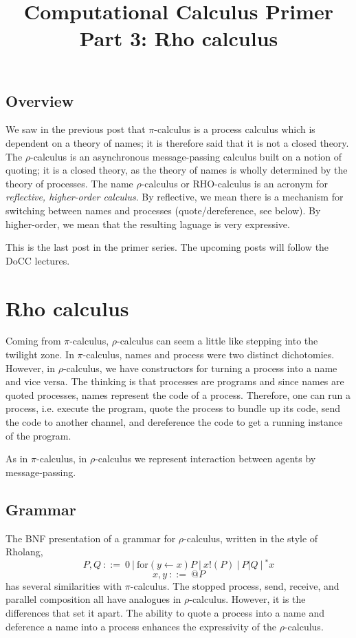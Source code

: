 \documentclass[12pt]{article}
\numberwithin{equation}{section}
\begin{document}
\author{}
\date{}
\title{Computational Calculus Primer Part 3: Rho calculus}

\maketitle

\subsection{Overview}
We saw in the previous post that $\pi$-calculus is a process calculus which is dependent on a theory of names; it is therefore said that it is not a closed theory. The $\rho$-calculus is an asynchronous message-passing calculus built on a notion of quoting; it is a closed theory, as the theory of names is wholly determined by the theory of processes. The name $\rho$-calculus or RHO-calculus is an acronym for \emph{reflective, higher-order calculus}. By reflective, we mean there is a mechanism for switching between names and processes (quote/dereference, see below). By higher-order, we mean that the resulting laguage is very expressive.

This is the last post in the primer series. The upcoming posts will follow the DoCC lectures.

\section{Rho calculus}
Coming from $\pi$-calculus, $\rho$-calculus can seem a little like stepping into the twilight zone. In $\pi$-calculus, names and process were two distinct dichotomies. However, in $\rho$-calculus, we have constructors for turning a process into a name and vice versa. The thinking is that processes are programs and since names are quoted processes, names represent the code of a process. Therefore, one can run a process, i.e. execute the program, quote the process to bundle up its code, send the code to another channel, and dereference the code to get a running instance of the program.

As in $\pi$-calculus, in $\rho$-calculus we represent interaction between agents by message-passing.

\subsection{Grammar}
The BNF presentation of a grammar for $\rho$-calculus, written in the style of Rholang,
\[ P, Q \ ::= \ 0 \ | \ \text{for}( y \leftarrow x)P \ | \ x!(P) \ | \ P | Q \ | \ {}^* x \]
\[ x, y \ ::= \ @P \]
has several similarities with $\pi$-calculus. The stopped process, send, receive, and parallel composition all have analogues in $\rho$-calculus. However, it is the differences that set it apart. The ability to quote a process into a name and deference a name into a process enhances the expressivity of the $\rho$-calculus.
\end{document}
